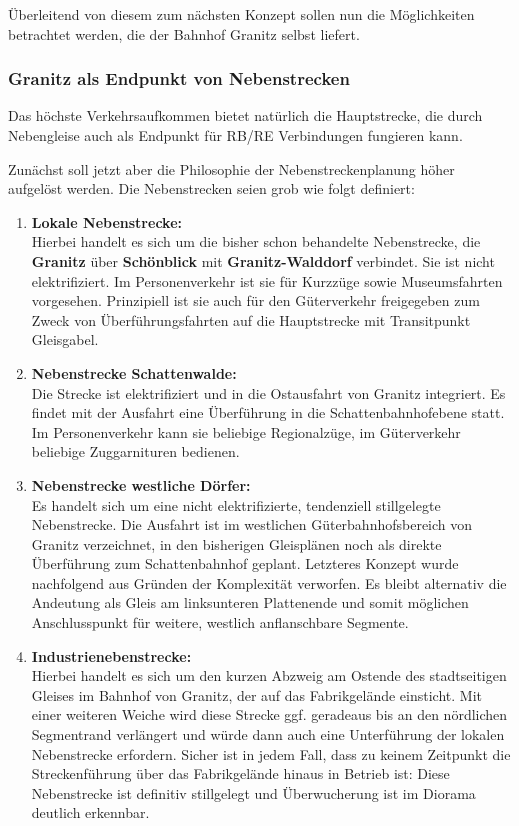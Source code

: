 \"Uberleitend von diesem zum n\"achsten Konzept sollen nun die M\"oglichkeiten betrachtet werden, die der Bahnhof Granitz selbst liefert.

\subsubsection{Granitz als Endpunkt von Nebenstrecken}
\label{sec:nebenstrecken}

Das h\"ochste Verkehrsaufkommen bietet nat\"urlich die Hauptstrecke, die durch Nebengleise auch als Endpunkt f\"ur RB/RE Verbindungen fungieren kann.

Zun\"achst soll jetzt aber die Philosophie der Nebenstreckenplanung h\"oher aufgel\"ost werden.
Die Nebenstrecken seien grob wie folgt definiert:
\begin{enumerate}
	\item \textbf{Lokale Nebenstrecke:}\\
	Hierbei handelt es sich um die bisher schon behandelte Nebenstrecke, die \textbf{Granitz} \"uber \textbf{Sch\"onblick} mit \textbf{Granitz-Walddorf} verbindet.
	Sie ist nicht elektrifiziert.
	Im Personenverkehr ist sie f\"ur Kurzz\"uge sowie Museumsfahrten vorgesehen.
	Prinzipiell ist sie auch f\"ur den G\"uterverkehr freigegeben zum Zweck von \"Uberf\"uhrungsfahrten auf die Hauptstrecke mit Transitpunkt Gleisgabel.
	\item \textbf{Nebenstrecke Schattenwalde:}\\
	Die Strecke ist elektrifiziert und in die Ostausfahrt von Granitz integriert.
	Es findet mit der Ausfahrt eine \"Uberf\"uhrung in die Schattenbahnhofebene statt.
	Im Personenverkehr kann sie beliebige Regionalz\"uge, im G\"uterverkehr beliebige Zuggarnituren bedienen.
	\item \textbf{Nebenstrecke westliche D\"orfer:}\\
	Es handelt sich um eine nicht elektrifizierte, tendenziell stillgelegte Nebenstrecke.
	Die Ausfahrt ist im westlichen G\"uterbahnhofsbereich von Granitz verzeichnet, in den bisherigen Gleispl\"anen noch als direkte \"Uberf\"uhrung zum Schattenbahnhof geplant.
	Letzteres Konzept wurde nachfolgend aus Gr\"unden der Komplexit\"at verworfen.
	Es bleibt alternativ die Andeutung als Gleis am linksunteren Plattenende und somit m\"oglichen Anschlusspunkt f\"ur weitere, westlich anflanschbare Segmente.
	\item \textbf{Industrienebenstrecke:}\\
	Hierbei handelt es sich um den kurzen Abzweig am Ostende des stadtseitigen Gleises im Bahnhof von Granitz, der auf das Fabrikgel\"ande einsticht.
	Mit einer weiteren Weiche wird diese Strecke ggf. geradeaus bis an den n\"ordlichen Segmentrand verl\"angert und w\"urde dann auch eine Unterf\"uhrung der lokalen Nebenstrecke erfordern.
	Sicher ist in jedem Fall, dass zu keinem Zeitpunkt die Streckenf\"uhrung \"uber das Fabrikgel\"ande hinaus in Betrieb ist:
	Diese Nebenstrecke ist definitiv stillgelegt und \"Uberwucherung ist im Diorama deutlich erkennbar.
\end{enumerate}

